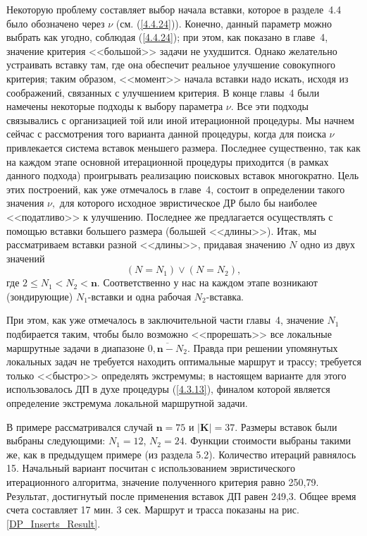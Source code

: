 \documentclass[11pt,twoside,openany]{report}
\newcommand{\ov}{\overline}
\newcommand{\nn}{{\mathbf n}}
\begin{document}
{{Некоторую проблему составляет выбор начала вставки, которое в разделе~4.4
было обозначено через $\nu$ (см. (\ref{4.4.24})). Конечно, данный параметр
можно выбрать как угодно, соблюдая (\ref{4.4.24}); при этом, как показано в
главе~4, значение критерия <<большой>> задачи не ухудшится. Однако желательно
устраивать вставку там, где она обеспечит реальное улучшение совокупного
критерия; таким образом, <<момент>> начала вставки надо искать, исходя из
соображений, связанных с улучшением критерия. В конце главы~4 были намечены
некоторые подходы к выбору параметра $\nu.$ Все эти подходы связывались с
организацией той или иной итерационной процедуры. Мы начнем сейчас с
рассмотрения того варианта данной процедуры, когда для поиска $\nu$
привлекается система вставок меньшего размера. Последнее существенно, так
как на каждом этапе основной итерационной процедуры  приходится (в рамках
данного подхода) проигрывать реализацию поисковых вставок многократно.
Цель этих построений, как  уже отмечалось в главе~4, состоит в определении
такого значения $\nu,$ для которого исходное эвристическое ДР было бы
наиболее <<податливо>> к улучшению. Последнее же предлагается осуществлять
с помощью вставки большего размера (большей <<длины>>). Итак, мы рассматриваем
вставки разной <<длины>>, придавая значению $N$ одно из двух значений
$$(N = N_1) \vee (N=N_2),
$$
где $2 \leqslant N_1 < N_2 <\nn.$ Соответственно у нас на каждом этапе
возникают (зондирующие) $N_1$-вставки и одна рабочая $N_2$-вставка.

При этом, как уже отмечалось в заключительной части главы~4, значение
$N_1$ подбирается таким, чтобы было возможно <<прорешать>> все локальные
маршрутные задачи в диапазоне $\ov{0,\nn-N_2}.$ Правда при решении упомянутых
локальных задач не требуется находить оптимальные маршрут и трассу; требуется
только <<быстро>> определять экстремумы; в настоящем варианте для этого
использовалось ДП в духе процедуры (\ref{4.3.13}), финалом которой является
определение экстремума локальной маршрутной задачи.

В примере рассматривался случай $\mathbf{n}=75$ и $|\mathbf{K}|=37$. Размеры вставок
были выбраны следующими: $N_1=12$, $N_2=24$.
Функции стоимости выбраны такими же, как в предыдущем примере (из раздела
5.2). Количество итераций равнялось
15. Начальный вариант посчитан с использованием эвристического итерационного
алгоритма, значение полученного критерия равно 250,79. Результат, достигнутый
после применения вставок ДП равен 249,3. Общее время счета составляет 17
мин. 3 сек. Маршрут и трасса показаны на рис. \ref{DP_Inserts_Result}.

}}
\end{document}
